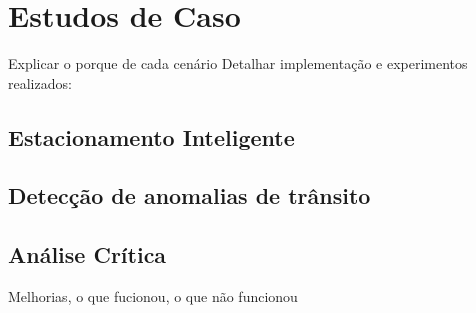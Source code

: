 \chapter{Estudos de Caso}
\label{cap:estudos-de-caso}

Explicar o porque de cada cenário
Detalhar implementação e experimentos realizados:

\section{Estacionamento Inteligente}
\section{Detecção de anomalias de trânsito}
\section{Análise Crítica}

Melhorias, o que fucionou, o que não funcionou
